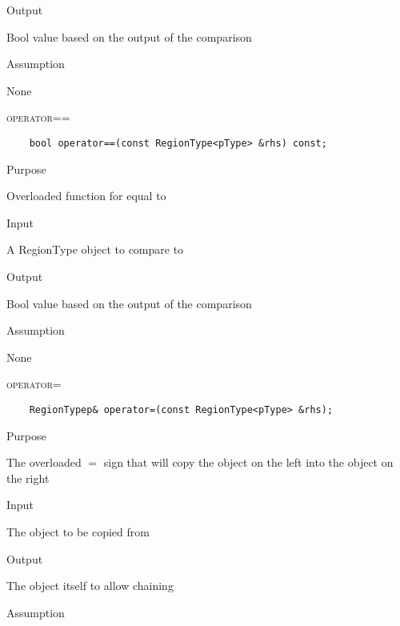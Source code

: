 \documentclass[pdftex, 11pt]{article}
\begin{document}
\begin{description}
\begin{description}
			\item{Output}

				Bool value based on the output of the comparison

			\item{Assumption}

				None

		\end{description}

	\item{\textsc{operator==}}
		\begin{description}
\begin{lstlisting}
	bool operator==(const RegionType<pType> &rhs) const;
\end{lstlisting}

			\item{Purpose}

				Overloaded function for equal to

			\item{Input}

				A RegionType object to compare to

			\item{Output}

				Bool value based on the output of the comparison

			\item{Assumption}

				None

		\end{description}

	\item{\textsc{operator= }}
		\begin{description}
\begin{lstlisting}
	RegionTypep& operator=(const RegionType<pType> &rhs);
\end{lstlisting}

			\item{Purpose}

				The overloaded $=$ sign that will copy the object on the left into the object on the right

			\item{Input}

				The object to be copied from

			\item{Output}

				The object itself to allow chaining

			\item{Assumption}


\end{description}
\end{description}
\end{document}
